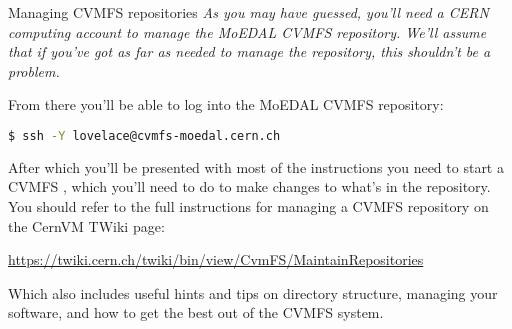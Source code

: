 \begin{warningbox}{Managing CVMFS repositories}
\emph{As you may have guessed, you'll need a CERN computing account
to manage the MoEDAL CVMFS repository. We'll assume that if you've
got as far as needed to manage the repository, this shouldn't be
a problem.}
\end{warningbox}

From there you'll be able to log into the MoEDAL \ac{CVMFS} repository:

\begin{lstlisting}[gobble=0,numbers=none,language=bash]
$ ssh -Y lovelace@cvmfs-moedal.cern.ch
\end{lstlisting}

After which you'll be presented with most of the instructions you need
to start a \ac{CVMFS} ,
which you'll need to do to make changes to what's in the repository.
You should refer to the full instructions for managing
a \ac{CVMFS} repository on the CernVM TWiki page:

\href{https://twiki.cern.ch/twiki/bin/view/CvmFS/MaintainRepositories}{https://twiki.cern.ch/twiki/bin/view/CvmFS/MaintainRepositories}

Which also includes useful hints and tips on directory structure,
managing your software, and how to get the best out of the
\ac{CVMFS} system.
